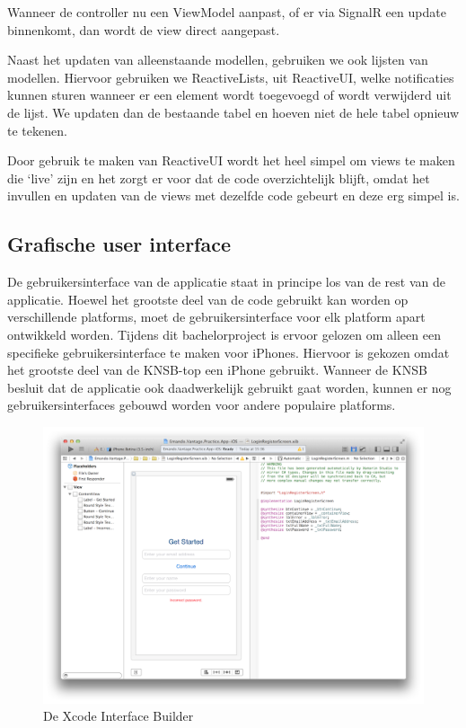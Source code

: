 
Wanneer de controller nu een ViewModel aanpast, of er via SignalR een update binnenkomt, dan wordt de view direct aangepast. 

Naast het updaten van alleenstaande modellen, gebruiken we ook lijsten van modellen. Hiervoor gebruiken we ReactiveLists, uit ReactiveUI, welke notificaties kunnen sturen wanneer er een element wordt toegevoegd of wordt verwijderd uit de lijst. We updaten dan de bestaande tabel en hoeven niet de hele tabel opnieuw te tekenen.

Door gebruik te maken van ReactiveUI wordt het heel simpel om views te maken die `live' zijn en het zorgt er voor dat de code overzichtelijk blijft, omdat het invullen en updaten van de views met dezelfde code gebeurt en deze erg simpel is.

\subsection{Grafische user interface}

De gebruikersinterface van de applicatie staat in principe los van de rest van de applicatie. Hoewel het grootste deel van de code gebruikt kan worden op verschillende platforms, moet de gebruikersinterface voor elk platform apart ontwikkeld worden. Tijdens dit bachelorproject is ervoor gelozen om alleen een specifieke gebruikersinterface te maken voor iPhones. Hiervoor is gekozen omdat het grootste deel van de KNSB-top een iPhone gebruikt. Wanneer de KNSB besluit dat de applicatie ook daadwerkelijk gebruikt gaat worden, kunnen er nog gebruikersinterfaces gebouwd worden voor andere populaire platforms.

\begin{figure}[h!t]
\centering
\includegraphics[width=\textwidth]{style/images/screenshots/InterfaceBuilder}
\caption{De Xcode Interface Builder}
\label{fig:interface-builder}
\end{figure}

